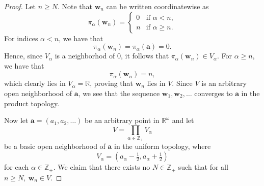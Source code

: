 \documentclass[a4paper,10pt]{article}
\newcommand{\bw}{\mathbf{w}}
\newcommand{\ZZ}{\mathbb{Z}}
\newcommand{\RR}{\mathbb{R}}
\begin{document}
\begin{solution}
\begin{proof}
        Let $n \geq N$.
        Note that $\bw_n$ can be written coordinatewise as
        \begin{equation*}
            \pi_\alpha(\bw_n) = \begin{cases}
                0   & \text{if } \alpha < n, \\
                n   & \text{if } \alpha \geq n.
            \end{cases}
        \end{equation*}
        For indices $\alpha < n$, we have that
        \begin{equation*}
            \pi_\alpha(\bw_n) = \pi_\alpha(\mathbf{a}) = 0.
        \end{equation*}
        Hence, since $V_\alpha$ is a neighborhod of $0$, it follows that $\pi_\alpha(\bw_n) \in V_\alpha$.
        For $\alpha \geq n$, we have that
        \begin{equation*}
            \pi_\alpha(\bw_n) = n,
        \end{equation*}
        which clearly lies in $V_\alpha = \RR$, proving that $\bw_n$ lies in $V$.
        Since $V$ is an arbitrary open neighborhood of $\mathbf{a}$, we see that the sequence $\bw_1, \bw_2, \ldots$ converges to $\mathbf{a}$ in the product topology.

        Now let $\mathbf{a} = (a_1, a_2, \ldots)$ be an arbitrary point in $\RR^\omega$ and let
        \begin{equation*}
            V = \prod_{\alpha \in \ZZ_+} V_\alpha
        \end{equation*}
        be a basic open neighborhood of $\mathbf{a}$ in the uniform topology, where
        \begin{equation*}
            V_\alpha = (a_\alpha - \tfrac{1}{2}, a_\alpha + \tfrac{1}{2})
        \end{equation*}
        for each $\alpha \in \ZZ_+$.
        We claim that there exists no $N \in \ZZ_+$ such that for all $n \geq N,~ \bw_n \in V$.


\end{proof}
\end{solution}
\end{document}
